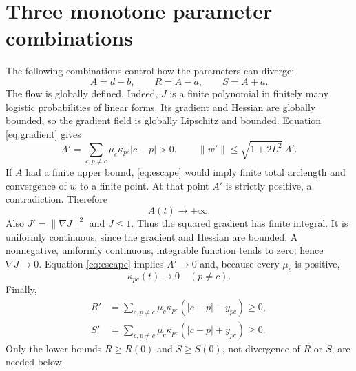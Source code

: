 \documentclass[11pt]{article}
\newcommand{\kap}{\kappa}
\newcommand{\grad}{\nabla}
\begin{document}
\section{Three monotone parameter combinations}
The following combinations control how the parameters can diverge:
\[
 A=d-b,\qquad R=A-a,\qquad S=A+a.
\]
The flow is globally defined. Indeed, $J$ is a finite polynomial in finitely
many logistic probabilities of linear forms. Its gradient and Hessian are
globally bounded, so the gradient field is globally Lipschitz and bounded.
Equation \eqref{eq:gradient} gives
\begin{equation}\label{eq:escape}
 A'=\sum_{c,p\ne c}\mu_c\kap_{pc}|c-p|>0,
 \qquad \|w'\|\le\sqrt{1+2L^2}\,A'.
\end{equation}
If $A$ had a finite upper bound, \eqref{eq:escape} would imply finite total
arclength and convergence of $w$ to a finite point. At that point $A'$ is
strictly positive, a contradiction. Therefore
\begin{equation}\label{eq:Ainfty} A(t)\longrightarrow+\infty.\end{equation}
Also $J'=\|\grad J\|^2$ and $J\le1$. Thus the squared gradient has finite
integral. It is uniformly continuous, since the gradient and Hessian are
bounded. A nonnegative, uniformly continuous, integrable function tends to
zero; hence $\grad J\to0$. Equation \eqref{eq:escape} implies $A'\to0$ and,
because every $\mu_c$ is positive,
\begin{equation}\label{eq:kzero} \kap_{pc}(t)\longrightarrow0\quad(p\ne c).\end{equation}
Finally,
\begin{align}
 R'&=\sum_{c,p\ne c}\mu_c\kap_{pc}(|c-p|-y_{pc})\ge0,\label{eq:R}\\
 S'&=\sum_{c,p\ne c}\mu_c\kap_{pc}(|c-p|+y_{pc})\ge0.\label{eq:S}
\end{align}
Only the lower bounds $R\ge R(0)$ and $S\ge S(0)$, not divergence of $R$ or
$S$, are needed below.
\end{document}

